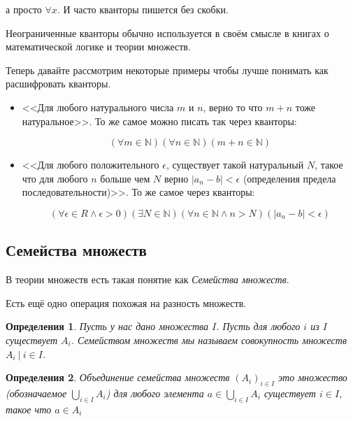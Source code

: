 \documentclass[a4paper, 16pt, oneside]{book}
\newtheorem{Definition}{Определения}[theorem]
\begin{document}
а просто \(\forall x\). И часто кванторы пишется без скобки.
\par Неограниченные кванторы обычно используется в своём смысле в книгах о математической логике и теории множеств.
\par Теперь давайте рассмотрим некоторые примеры чтобы лучше понимать как расшифровать кванторы.
\begin{itemize}
    \item <<Для любого натурального числа \(m\) и \(n\), верно то что \(m + n\) тоже натуральное>>. То же самое можно писать так через кванторы: \par
        \begin{equation*}
            (\forall m \in \mathbb{N})(\forall n \in \mathbb{N})(m + n \in \mathbb{N})
        \end{equation*}
    \item <<Для любого положительного \(\epsilon\), существует такой натуральный \(N\),
        такое что для любого \(n\) больше чем \(N\) верно \(\left|a_n - b\right| < \epsilon\) (определения предела последовательности)>>.
        То же самое через кванторы: \par
        \begin{equation*}
            (\forall \epsilon \in R \land \epsilon > 0)(\exists N \in \mathbb{N})(\forall n \in \mathbb{N} \land n > N) (\left|a_n - b\right| < \epsilon)
        \end{equation*}
\end{itemize}

\subsection{Семейства множеств}

\par В теории множеств есть такая понятие как \textit{Семейства множеств}.

\par Есть ещё одно операция похожая на разность множеств.
\begin{Definition}
    \label{definiton:set_families}
    Пусть у нас дано множества \(I\). Пусть для любого \(i\) из \(I\) существует \(A_i\).
    Семейством множеств мы называем совокупность множеств \(A_i\ |\ i \in I\).
\end{Definition}

\begin{Definition}
    \label{definiton:union_set_families}
    Объединение семейства множеств \((A_i)_{i \in I}\) это множество
    (обозначаемое \(\underset{i \in I}{\bigcup} A_i\)) для любого элемента \(a \in \underset{i \in I}{\bigcup} A_i\)
    существует \(i \in I\), такое что \(a \in A_i\)
\end{Definition}
\end{document}
